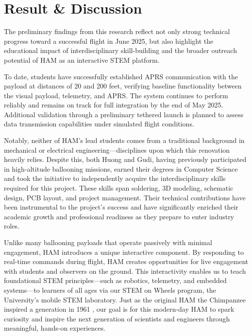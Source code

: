 \vspace{-2em}
\section{Result \& Discussion}
\vspace{-2em}

The preliminary findings from this research reflect not only strong technical progress toward a successful flight in June 2025, but also highlight the educational impact of interdisciplinary skill-building and the broader outreach potential of HAM as an interactive STEM platform.

To date, students have successfully established APRS communication with the payload at distances of 20 and 200 feet, verifying baseline functionality between the visual payload, telemetry, and APRS. The system continues to perform reliably and remains on track for full integration by the end of May 2025. Additional validation through a preliminary tethered launch is planned to assess data transmission capabilities under simulated flight conditions.

Notably, neither of HAM’s lead students comes from a traditional background in mechanical or electrical engineering—disciplines upon which this renovation heavily relies. Despite this, both Huong and Gudi, having previously participated in high-altitude ballooning missions, earned their degrees in Computer Science and took the initiative to independently acquire the interdisciplinary skills required for this project. These skills span soldering, 3D modeling, schematic design, PCB layout, and project management. Their technical contributions have been instrumental to the project’s success and have significantly enriched their academic growth and professional readiness as they prepare to enter industry roles.

Unlike many ballooning payloads that operate passively with minimal engagement, HAM introduces a unique interactive component. By responding to real-time commands during flight, HAM creates opportunities for live engagement with students and observers on the ground. This interactivity enables us to teach foundational STEM principles—such as robotics, telemetry, and embedded systems—to learners of all ages via our STEM on Wheels program, the University's mobile STEM laboratory. Just as the original HAM the Chimpanzee inspired a generation in 1961 \cite{Burgess2014}, our goal is for this modern-day HAM to spark curiosity and inspire the next generation of scientists and engineers through meaningful, hands-on experiences.